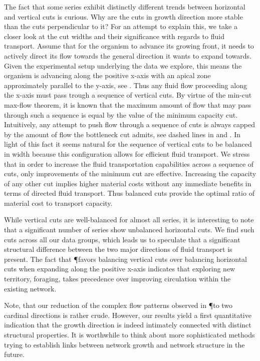 		The fact that some series exhibit distinctly different trends between horizontal and vertical cuts is curious. Why are the cuts in growth direction more stable than the cuts perpendicular to it? For an attempt to explain this, we take a closer look at the cut widths and their significance with regards to fluid transport. Assume that for the organism to advance its growing front, it needs to actively direct its flow towards the general direction it wants to expand towards. Given the experimental setup underlying the data we explore, this means the organism is advancing along the positive x-axis with an apical zone approximately parallel to the y-axis, see . Thus any fluid flow proceeding along the x-axis must pass trough a sequence of vertical cuts. By virtue of the min-cut max-flow theorem, it is known that the maximum amount of flow that may pass through such a sequence is equal by the value of the minimum capacity cut. Intuitively, any attempt to push flow through a sequence of cuts is always capped by the amount of flow the bottleneck cut admits, see dashed lines in  and . In light of this fact it seems natural for the sequence of vertical cuts to be balanced in width because this configuration allows for efficient fluid transport. We stress that in order to increase the fluid transportation capabilities across a sequence of cuts, only improvements of the minimum cut are effective. Increasing the capacity of any other cut implies higher material costs without any immediate benefits in terms of directed fluid transport. Thus balanced cuts provide the optimal ratio of material cost to transport capacity.

		While vertical cuts are well-balanced for almost all series, it is interesting to note that a significant number of series show unbalanced horizontal cuts. We find such cuts across all our data groups, which leads us to speculate that a significant structural difference between the two major directions of fluid transport is present. The fact that \P favors balancing vertical cuts over balancing horizontal cuts when expanding along the positive x-axis indicates that exploring new territory, \ie foraging, takes precedence over improving circulation within the existing network.

		Note, that our reduction of the complex flow patterns observed in \P to two cardinal directions is rather crude. However, our results yield a first quantitative indication that the growth direction is indeed intimately connected with distinct structural properties. It is worthwhile to think about more sophisticated methods trying to establish links between network growth and network structure in the future.


